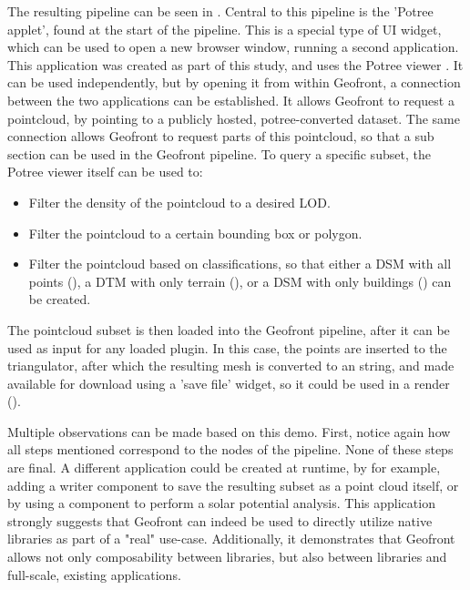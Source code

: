 The resulting pipeline can be seen in . 
Central to this pipeline is the 'Potree applet', found at the start of the pipeline. This is a special type of \ac{UI} widget, which can be used to open a new browser window, running a second application.
This application was created as part of this study, and uses the Potree viewer \citep*{schutz_potree_2022}. 
It can be used independently, but by opening it from within Geofront, a connection between the two applications can be established. 
It allows Geofront to request a pointcloud, by pointing to a publicly hosted, potree-converted dataset. 
The same connection allows Geofront to request parts of this pointcloud, so that a sub section can be used in the Geofront pipeline. 
To query a specific subset, the Potree viewer itself can be used to:
\begin{itemize}[-]
  \item Filter the density of the pointcloud to a desired LOD.
  \item Filter the pointcloud to a certain bounding box or polygon.
  \item Filter the pointcloud based on classifications, so that either 
  \subitem a DSM with all points (),
  \subitem a DTM with only terrain (), or
  \subitem a DSM with only buildings () can be created.
\end{itemize}

The pointcloud subset is then loaded into the Geofront pipeline, after it can be used as input for any loaded plugin. 
In this case, the points are inserted to the  triangulator, after which the resulting mesh is converted to an  string, and made available for download using a 'save file' widget, so it could be used in a render ().


Multiple observations can be made based on this demo.
First, notice again how all steps mentioned correspond to the nodes of the pipeline. 
None of these steps are final. 
A different application could be created at runtime, by for example, adding a  writer component to save the resulting subset as a point cloud itself, or by using a component to perform a solar potential analysis. 
This application strongly suggests that Geofront can indeed be used to directly utilize native libraries as part of a "real" use-case.
Additionally, it demonstrates that Geofront allows not only composability between libraries, but also between libraries and full-scale, existing applications.


